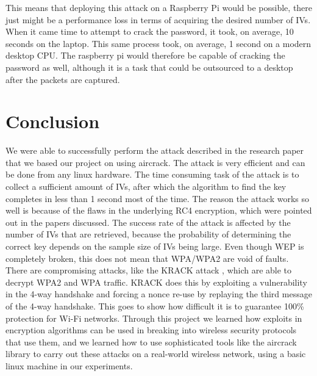 \documentclass[10pt, titlepage]{article}
\begin{document}
This means that deploying this attack on a Raspberry Pi would be possible, there just might be a performance loss in terms of acquiring the desired number of IVs. When it came time to attempt to crack the password, it took, on average, 10 seconds on the laptop. This same process took, on average, 1 second on a modern desktop CPU. The raspberry pi would therefore be capable of cracking the password as well, although it is a task that could be outsourced to a desktop after the packets are captured.



\section{Conclusion}
We were able to successfully perform the attack described in the research paper that we based our project on using aircrack. The attack is very efficient and can be done from any linux hardware. The time consuming task of the attack is to collect a sufficient amount of IVs, after which the algorithm to find the key completes in less than 1 second most of the time. The reason the attack works so well is because of the flaws in the underlying RC4 encryption, which were pointed out in the papers discussed. The success rate of the attack is affected by the number of IVs that are retrieved, because the probability of determining the correct key depends on the sample size of IVs being large. Even though WEP is completely broken, this does not mean that WPA/WPA2 are void of faults. There are compromising attacks, like the KRACK attack \cite{krack}, which are able to decrypt WPA2 and WPA traffic. KRACK does this by exploiting a vulnerability in the 4-way handshake and forcing a nonce re-use by replaying the third message of the 4-way handshake. This goes to show how difficult it is to guarantee 100\% protection for Wi-Fi networks. Through this project we learned how exploits in encryption algorithms can be used in breaking into wireless security protocols that use them, and we learned how to use sophisticated tools like the aircrack library to carry out these attacks on a real-world wireless network, using a basic linux machine in our experiments. 


\newpage

{}
\newpage


\end{document}

